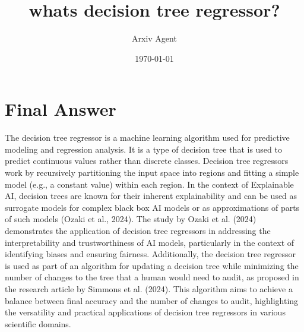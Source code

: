 \documentclass{article}%
\title{whats decision tree regressor?}%
\author{Arxiv Agent}%
\date{\today}%
\begin{document}
%
\normalsize%
\maketitle%
\section{Final Answer}%
\label{sec:FinalAnswer}%
The decision tree regressor is a machine learning algorithm used for predictive modeling and regression analysis. It is a type of decision tree that is used to predict continuous values rather than discrete classes. Decision tree regressors work by recursively partitioning the input space into regions and fitting a simple model (e.g., a constant value) within each region. In the context of Explainable AI, decision trees are known for their inherent explainability and can be used as surrogate models for complex black box AI models or as approximations of parts of such models (Ozaki et al., 2024). The study by Ozaki et al. (2024) demonstrates the application of decision tree regressors in addressing the interpretability and trustworthiness of AI models, particularly in the context of identifying biases and ensuring fairness. Additionally, the decision tree regressor is used as part of an algorithm for updating a decision tree while minimizing the number of changes to the tree that a human would need to audit, as proposed in the research article by Simmons et al. (2024). This algorithm aims to achieve a balance between final accuracy and the number of changes to audit, highlighting the versatility and practical applications of decision tree regressors in various scientific domains.

%
\end{document}
